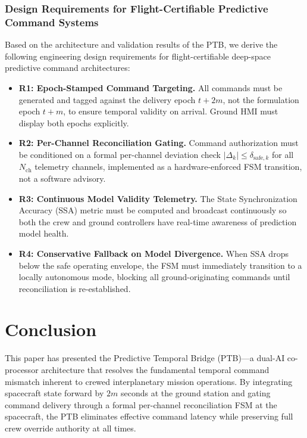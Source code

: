 \documentclass[ASNA,twocolumn]{USG}
\begin{document}
\subsubsection{Design Requirements for Flight-Certifiable Predictive Command Systems}
Based on the architecture and validation results of the PTB, we derive the following engineering
design requirements for flight-certifiable deep-space predictive command architectures:
\begin{itemize}
  \item \textbf{R1: Epoch-Stamped Command Targeting.} All commands must be generated and tagged
        against the delivery epoch \(t+2m\), not the formulation epoch \(t+m\), to ensure temporal
        validity on arrival. Ground HMI must display both epochs explicitly.
  \item \textbf{R2: Per-Channel Reconciliation Gating.} Command authorization must be conditioned
        on a formal per-channel deviation check \(|\Delta_k| \le \delta_{\text{safe},k}\) for all
        \(N_\text{ch}\) telemetry channels, implemented as a hardware-enforced FSM transition, not
        a software advisory.
  \item \textbf{R3: Continuous Model Validity Telemetry.} The State Synchronization Accuracy (SSA)
        metric must be computed and broadcast continuously so both the crew and ground controllers
        have real-time awareness of prediction model health.
  \item \textbf{R4: Conservative Fallback on Model Divergence.} When SSA drops below the safe
        operating envelope, the FSM must immediately transition to a locally autonomous mode,
        blocking all ground-originating commands until reconciliation is re-established.
\end{itemize}

\section{Conclusion}

This paper has presented the Predictive Temporal Bridge (PTB)---a dual-AI co-processor architecture that
resolves the fundamental temporal command mismatch inherent to crewed interplanetary mission operations.
By integrating spacecraft state forward by \(2m\) seconds at the ground station and gating command delivery
through a formal per-channel reconciliation FSM at the spacecraft, the PTB eliminates effective command
latency while preserving full crew override authority at all times.
\end{document}
